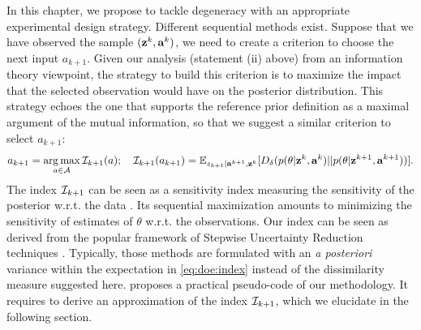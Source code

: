 In this chapter, we propose to tackle degeneracy with an appropriate experimental design strategy. 
Different sequential methods exist. Suppose that we have observed the sample $(\mathbf{z}^k,\mathbf{a}^k)$, we need to create a criterion to choose the next input $a_{k+1}$. 
Given our analysis (statement (ii) above) from an information theory viewpoint, the strategy to build this criterion is to maximize the impact that the selected observation would have on the posterior distribution. 
This strategy echoes the one that supports the reference prior definition as a maximal argument of the mutual information, so that we suggest a similar criterion to select $a_{k+1}$:
      \begin{equation}\label{eq:doe:index}
        a_{k+1}=\operatorname*{arg\,max}_{a\in\mathcal{A}}\mathcal{I}_{k+1}(a);\quad 
            \mathcal{I}_{k+1}(a_{k+1}) = \mathbb{E}_{{z_{k+1}}|\mathbf{a}^{k+1},\mathbf{z}^k}[D_\delta(p(\theta|\mathbf{z}^k,\mathbf{a}^k)||p(\theta|\mathbf{z}^{k+1},\mathbf{a}^{k+1}))].
    \end{equation}
The index $\mathcal{I}_{k+1}$ can be seen as a sensitivity index measuring the sensitivity of the posterior w.r.t. the data \citep{da_veiga_global_2015}. Its sequential maximization amounts to minimizing the sensitivity of estimates of $\theta$ w.r.t. the observations.
Our index can be seen as derived from the popular framework of Stepwise Uncertainty Reduction techniques \citep{bect_supermartingale_2019}. 
Typically,  those methods are formulated with an \emph{a posteriori} variance within the expectation in \cref{eq:doe:index} instead of the dissimilarity measure suggested here.
 proposes a practical pseudo-code of our methodology. It requires to derive an approximation of the index $\mathcal{I}_{k+1}$, which we elucidate in the following section.





\renewcommand{\algorithmicrequire}{\textbf{Notations:}}

